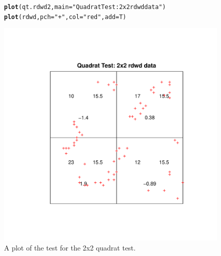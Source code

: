 \documentclass{article}\usepackage[]{graphicx}\usepackage[]{color}
\makeatletter
\def\maxwidth{ %
  \ifdim\Gin@nat@width>\linewidth
    \linewidth
  \else
    \Gin@nat@width
  \fi
}
\newcommand{\hlstr}[1]{\textcolor[rgb]{0.192,0.494,0.8}{#1}}%
\newcommand{\hlstd}[1]{\textcolor[rgb]{0.345,0.345,0.345}{#1}}%
\newcommand{\hlkwc}[1]{\textcolor[rgb]{0.333,0.667,0.333}{#1}}%
\newcommand{\hlkwd}[1]{\textcolor[rgb]{0.737,0.353,0.396}{\textbf{#1}}}%
\newenvironment{kframe}{%
 \def\at@end@of@kframe{}%
 \ifinner\ifhmode%
  \def\at@end@of@kframe{\end{minipage}}%
  \begin{minipage}{\columnwidth}%
 \fi\fi%
 \def\FrameCommand##1{\hskip\@totalleftmargin \hskip-\fboxsep
 \colorbox{shadecolor}{##1}\hskip-\fboxsep
     \hskip-\linewidth \hskip-\@totalleftmargin \hskip\columnwidth}%
 \MakeFramed {\advance\hsize-\width
   \@totalleftmargin\z@ \linewidth\hsize
   \@setminipage}}%
 {\par\unskip\endMakeFramed%
 \at@end@of@kframe}
\newenvironment{knitrout}{}{} %
\makeatother
\begin{document}
\begin{figure}
\begin{knitrout}
\color{fgcolor}\begin{kframe}
\begin{alltt}
\hlkwd{plot}\hlstd{(qt.rdwd2,} \hlkwc{main}\hlstd{=}\hlstr{"Quadrat Test: 2x2 rdwd data"}\hlstd{)}
\hlkwd{plot}\hlstd{(rdwd,} \hlkwc{pch}\hlstd{=}\hlstr{"+"}\hlstd{,} \hlkwc{col}\hlstd{=}\hlstr{"red"}\hlstd{,} \hlkwc{add}\hlstd{=T)}
\end{alltt}
\end{kframe}
\includegraphics[width=\maxwidth]{figure/plottests2x2} 

\end{knitrout}
\caption{A plot of the test for the 2x2 quadrat test.}
\label{qt.rdwd2}
\end{figure}
\end{document}
